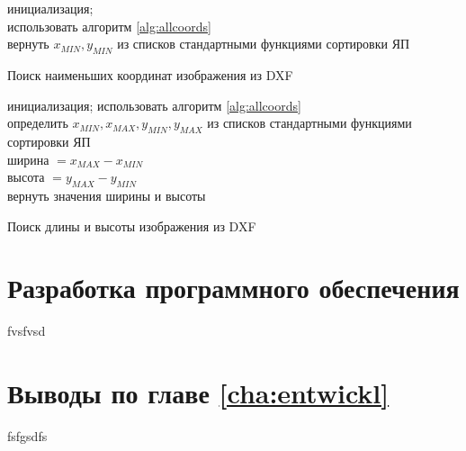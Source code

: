 \begin{algorithm}[H]
	\SetAlgoLined
	инициализация;\\
	использовать алгоритм \ref{alg:allcoords}\\
	вернуть $x_{MIN}, y_{MIN}$ из списков стандартными функциями сортировки ЯП
	\caption{Поиск наименьших координат изображения из DXF}
	\label{alg:extremums}
\end{algorithm}

\begin{algorithm}[H]
	\SetAlgoLined
	инициализация;
	использовать алгоритм \ref{alg:allcoords}\\
	определить $x_{MIN}, x_{MAX}, y_{MIN}, y_{MAX}$ из списков стандартными функциями сортировки ЯП\\
	ширина $=x_{MAX}-x_{MIN}$\\
	высота $=y_{MAX}-y_{MIN}$\\
	вернуть значения ширины и высоты
	\caption{Поиск длины и высоты изображения из DXF}
	\label{alg:dimes}
\end{algorithm}

\section{Разработка программного обеспечения}
fvsfvsd

\section{Выводы по главе \ref{cha:entwickl}}
fsfgsdfs
